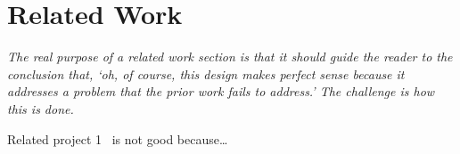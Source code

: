 \section{Related Work}
\label{sec:related}

{\em The real purpose of a related work section is that it should
  guide the reader to the conclusion that, `oh, of course, this design
  makes perfect sense because it addresses a problem that the prior
  work fails to address.'  The challenge is how this is done.}

Related project 1~\cite{relproj1} is not good because\ldots
